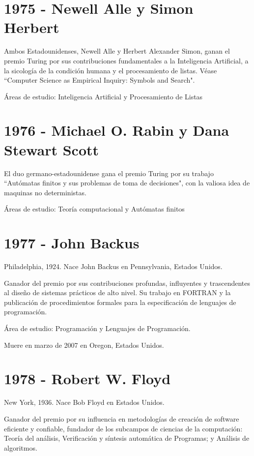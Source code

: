 \documentclass[notitlepage,letterpaper, 11pt]{article}
\begin{document}
\section*{1975 - Newell Alle y Simon Herbert}
\noindent Ambos Estadounidenses, Newell Alle y Herbert Alexander Simon, ganan el premio Turing por sus contribuciones fundamentales a la Inteligencia Artificial, a la sicología de la condición humana y el procesamiento de listas. Véase ``Computer Science as Empirical Inquiry:
Symbols and Search".

\noindent Áreas de estudio: Inteligencia Artificial y Procesamiento de Listas
\newline

\section*{1976 - Michael O. Rabin y Dana Stewart Scott}
\noindent El duo germano-estadounidense gana el premio Turing por su trabajo ``Autómatas finitos y sus problemas de toma de decisiones", con la valiosa idea de maquinas no deterministas.

\noindent Áreas de estudio: Teoría computacional y Autómatas finitos
\newline

\section*{1977 - John Backus}
\noindent Philadelphia, 1924. Nace John Backus en Pennsylvania, Estados Unidos.

\noindent Ganador del premio por sus contribuciones profundas, influyentes y trascendentes al diseño de sistemas prácticos de alto nivel. Su trabajo en FORTRAN y la publicación de procedimientos formales para la especificación de lenguajes de programación.

\noindent Área de estudio: Programación y Lenguajes de Programación.

\noindent Muere en marzo de 2007 en Oregon, Estados Unidos.
\newline

\section*{1978 - Robert W. Floyd}
\noindent New York, 1936. Nace Bob Floyd en Estados Unidos.

\noindent Ganador del premio por su influencia en metodologías de creación de software eficiente y confiable, fundador de los subcampos de ciencias de la computación: Teoría del análisis, Verificación y síntesis automática de Programas; y Análisis de algoritmos. 
\end{document}
